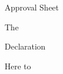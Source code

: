 \documentclass[12pt,letterpaper]{article}
\begin{document}

\newpage
    \begin{center}
        \vspace*{1cm}
        
        \LARGE Approval Sheet
        
        \vspace{1.2cm}
        
       \large The 
        
        
        
    \end{center}


\newpage
    \begin{center}
        \vspace*{1cm}

            \LARGE Declaration

            \vspace{1.2cm}

            \large Here to 
    \end{center}
\end{document}
